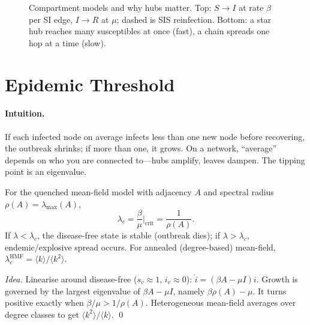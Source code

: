\begin{figure}[h]
\caption{Compartment models and why hubs matter. Top: $S\to I$ at rate $\beta$ per SI edge, $I\to R$ at $\mu$; dashed is SIS reinfection. Bottom: a star hub reaches many susceptibles at once (fast), a chain spreads one hop at a time (slow).}
\label{fig:sir-compartments}
\end{figure}

\section{Epidemic Threshold}
\label{sec:threshold}
\paragraph{Intuition.} If each infected node on average infects less than one new node before recovering, the outbreak shrinks; if more than one, it grows. On a network, ``average'' depends on who you are connected to---hubs amplify, leaves dampen. The tipping point is an eigenvalue.

\begin{theorem}\label{thm:threshold}
For the quenched mean-field model with adjacency $A$ and spectral radius $\rho(A)=\lambda_{\max}(A)$,
\begin{equation}
\lambda_c=\frac{\beta}{\mu}\Big|_{\text{crit}}=\frac1{\rho(A)}.
\end{equation}
If $\lambda<\lambda_c$, the disease-free state is stable (outbreak dies); if $\lambda>\lambda_c$, endemic/explosive spread occurs. For annealed (degree-based) mean-field,
$\lambda_c^{\text{HMF}}=\langle k\rangle/\langle k^2\rangle$.
\end{theorem}
\begin{proof}[Idea]
Linearise around disease-free ($s_v\approx1$, $i_v\approx0$): $\dot i = (\beta A-\mu I)i$. Growth is governed by the largest eigenvalue of $\beta A-\mu I$, namely $\beta\rho(A)-\mu$. It turns positive exactly when $\beta/\mu>1/\rho(A)$. Heterogeneous mean-field averages over degree classes to get $\langle k^2\rangle/\langle k\rangle$. \qed
\end{proof}

